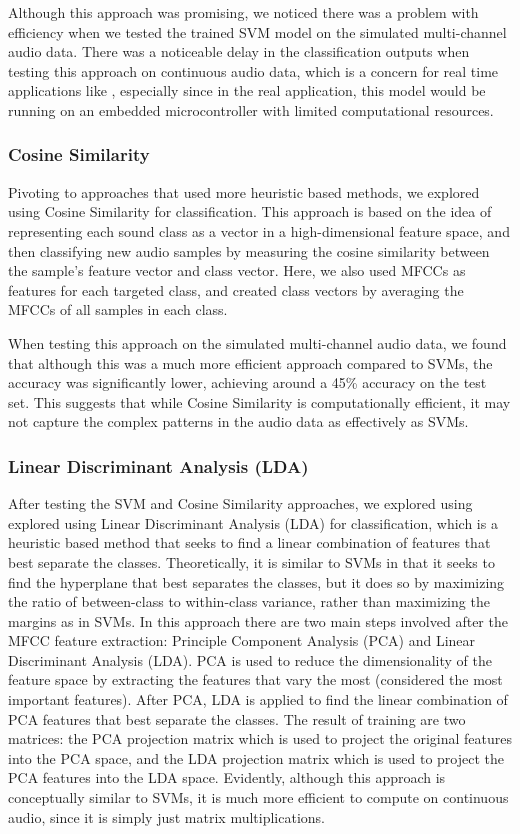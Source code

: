 \documentclass[12pt, titlepage]{article}
\begin{document}
Although this approach was promising, we noticed there was a problem with 
efficiency when we tested the trained SVM model on the simulated 
multi-channel audio data. There was a noticeable delay in the classification 
outputs when testing this approach on continuous audio data, which is a concern 
for real time applications like \progname{}, especially since in the real 
application, this model would be running on an embedded microcontroller with 
limited computational resources.


\subsubsection{Cosine Similarity}


Pivoting to approaches that used more heuristic based methods, we explored 
using Cosine Similarity for classification. This approach is based on the idea 
of representing each sound class as a vector in a high-dimensional feature 
space, and then classifying new audio samples by measuring the cosine 
similarity between the sample's feature vector and class vector. Here, we 
also used MFCCs as features for each targeted class, 
and created class vectors by averaging the MFCCs of all samples in each class. 


When testing this approach on the simulated multi-channel audio data, we found 
that although this was a much more efficient approach compared to SVMs, the 
accuracy was significantly lower, achieving around a 45\% accuracy on the test 
set. This suggests that while Cosine Similarity is computationally efficient, 
it may not capture the complex patterns in the audio data as effectively as 
SVMs.


\subsubsection{Linear Discriminant Analysis (LDA)}


After testing the SVM and Cosine Similarity approaches, we explored using 
explored using Linear Discriminant Analysis (LDA) for classification, which 
is a heuristic based method that seeks to find a linear combination of features 
that best separate the classes. Theoretically, it is similar to SVMs in that it 
seeks to find the hyperplane that best separates the classes, but it does so by 
maximizing the ratio of between-class to within-class variance, rather than 
maximizing the margins as in SVMs. In this approach there are two main steps 
involved after the MFCC feature extraction: Principle Component Analysis (PCA) 
and Linear Discriminant Analysis (LDA). PCA is used to reduce the 
dimensionality of the feature space by extracting the features that vary the 
most (considered the most important features). After PCA, LDA is applied to 
find the linear combination of PCA features that best separate the classes. 
The result of training are two matrices: the PCA projection matrix which 
is used to project the original features into the PCA space, and the LDA 
projection matrix which is used to project the PCA features into the LDA space.
Evidently, although this approach is conceptually similar to SVMs, it is much 
more efficient to compute on continuous audio, since it is simply just matrix 
multiplications. 
\end{document}
